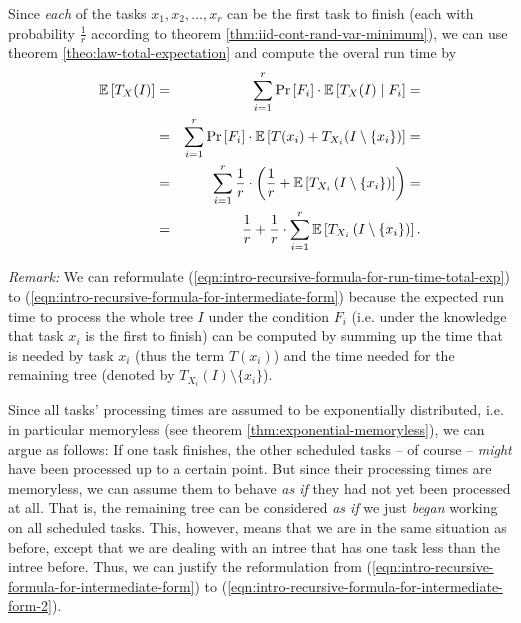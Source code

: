 \begin{itemize}
  Since \emph{each} of the tasks $x_1,x_2,\dots,x_r$ can be the first task to finish (each with probability $\frac{1}{r}$ according to theorem \ref{thm:iid-cont-rand-var-minimum}), we can use theorem \ref{theo:law-total-expectation} and compute the overal run time by 
  \begin{eqnarray}
    \label{eqn:intro-recursive-formula-for-run-time-total-exp}
    \mathbb{E}\left[ T_X(I) \right]
    &=& 
    \sum_{i=1}^r \operatorname{Pr}\left[F_i\right] \cdot \mathbb{E}\left[ T_{X} (I) \mid F_i \right]
    = \\
    &=& 
    \label{eqn:intro-recursive-formula-for-intermediate-form}
    \sum_{i=1}^r \operatorname{Pr}\left[F_i\right] \cdot \mathbb{E}\left[ T(x_i) + T_{X_i} (I \setminus \{x_i\}) \right]
    = \\
    \label{eqn:intro-recursive-formula-for-intermediate-form-2}
    &=& \sum_{i=1}^r \frac{1}{r} \cdot \left( \frac{1}{r} + \mathbb{E}\left[ T_{X_i}\left( I\setminus\left\{ x_i \right\} \right) \right] \right) = \\
    \label{eqn:intro-recursive-formula-for-run-time}
    &=&     
    \frac{1}{r} + \frac{1}{r} \cdot \sum_{i=1}^r \mathbb{E}\left[ T_{X_i}\left( I\setminus\left\{ x_i \right\} \right) \right].
  \end{eqnarray}
\end{itemize}

\emph{Remark:} We can reformulate (\ref{eqn:intro-recursive-formula-for-run-time-total-exp}) to (\ref{eqn:intro-recursive-formula-for-intermediate-form}) because the expected run time to process the whole tree $I$ under the condition $F_i$ (i.e. under the knowledge that task $x_i$ is the first to finish) can be computed by summing up the time that is needed by task $x_i$ (thus the term $T(x_i)$) and the time needed for the remaining tree (denoted by $T_{X_i}(I)\setminus\{x_i\}$).

Since all tasks' processing times are assumed to be exponentially distributed, i.e. in particular memoryless (see theorem \ref{thm:exponential-memoryless}), we can argue as follows: If one task finishes, the other scheduled tasks -- of course -- \emph{might} have been processed up to a certain point. But since their processing times are memoryless, we can assume them to behave \emph{as if} they had not yet been processed at all. That is, the remaining tree can be considered \emph{as if} we just \emph{began} working on all scheduled tasks. This, however, means that we are in the same situation as before, except that we are dealing with an intree that has one task less than the intree before. Thus, we can justify the reformulation from (\ref{eqn:intro-recursive-formula-for-intermediate-form}) to (\ref{eqn:intro-recursive-formula-for-intermediate-form-2}).

